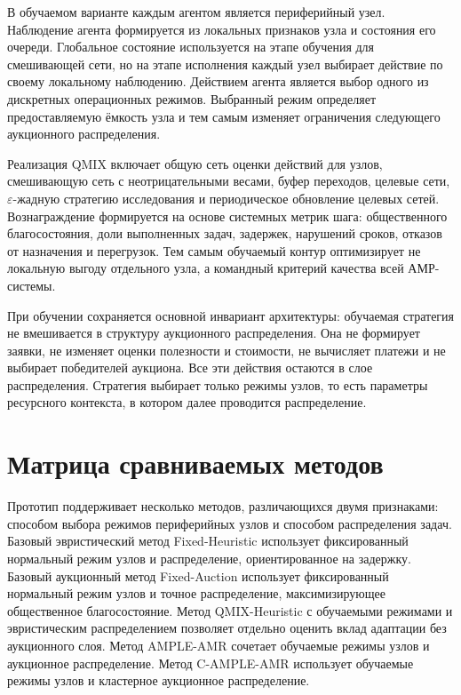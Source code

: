 В обучаемом варианте каждым агентом является периферийный узел. Наблюдение агента формируется из локальных признаков узла и состояния его очереди. Глобальное состояние используется на этапе обучения для смешивающей сети, но на этапе исполнения каждый узел выбирает действие по своему локальному наблюдению. Действием агента является выбор одного из дискретных операционных режимов. Выбранный режим определяет предоставляемую ёмкость узла и тем самым изменяет ограничения следующего аукционного распределения.

Реализация QMIX включает общую сеть оценки действий для узлов, смешивающую сеть с неотрицательными весами, буфер переходов, целевые сети, $\varepsilon$-жадную стратегию исследования и периодическое обновление целевых сетей. Вознаграждение формируется на основе системных метрик шага: общественного благосостояния, доли выполненных задач, задержек, нарушений сроков, отказов от назначения и перегрузок. Тем самым обучаемый контур оптимизирует не локальную выгоду отдельного узла, а командный критерий качества всей АМР-системы.

При обучении сохраняется основной инвариант архитектуры: обучаемая стратегия не вмешивается в структуру аукционного распределения. Она не формирует заявки, не изменяет оценки полезности и стоимости, не вычисляет платежи и не выбирает победителей аукциона. Все эти действия остаются в слое распределения. Стратегия выбирает только режимы узлов, то есть параметры ресурсного контекста, в котором далее проводится распределение.

\section{Матрица сравниваемых методов}

Прототип поддерживает несколько методов, различающихся двумя признаками: способом выбора режимов периферийных узлов и способом распределения задач. Базовый эвристический метод Fixed-Heuristic использует фиксированный нормальный режим узлов и распределение, ориентированное на задержку. Базовый аукционный метод Fixed-Auction использует фиксированный нормальный режим узлов и точное распределение, максимизирующее общественное благосостояние. Метод QMIX-Heuristic с обучаемыми режимами и эвристическим распределением позволяет отдельно оценить вклад адаптации без аукционного слоя. Метод AMPLE-AMR сочетает обучаемые режимы узлов и аукционное распределение. Метод C-AMPLE-AMR использует обучаемые режимы узлов и кластерное аукционное распределение.

